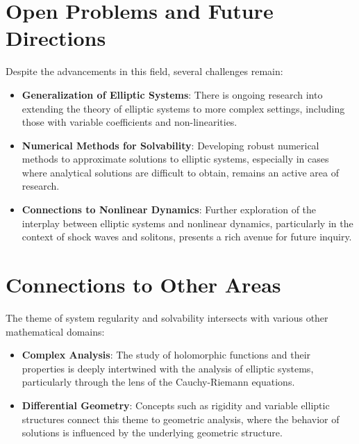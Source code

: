 \documentclass[11pt,a4paper]{article}
\begin{document}
\section{Open Problems and Future Directions}
Despite the advancements in this field, several challenges remain:

\begin{itemize}
\item \textbf{Generalization of Elliptic Systems}: There is ongoing research into extending the theory of elliptic systems to more complex settings, including those with variable coefficients and non-linearities.
\end{itemize}

\begin{itemize}
\item \textbf{Numerical Methods for Solvability}: Developing robust numerical methods to approximate solutions to elliptic systems, especially in cases where analytical solutions are difficult to obtain, remains an active area of research.
\end{itemize}

\begin{itemize}
\item \textbf{Connections to Nonlinear Dynamics}: Further exploration of the interplay between elliptic systems and nonlinear dynamics, particularly in the context of shock waves and solitons, presents a rich avenue for future inquiry.
\end{itemize}

\section{Connections to Other Areas}
The theme of system regularity and solvability intersects with various other mathematical domains:

\begin{itemize}
\item \textbf{Complex Analysis}: The study of holomorphic functions and their properties is deeply intertwined with the analysis of elliptic systems, particularly through the lens of the Cauchy-Riemann equations.
\end{itemize}

\begin{itemize}
\item \textbf{Differential Geometry}: Concepts such as rigidity and variable elliptic structures connect this theme to geometric analysis, where the behavior of solutions is influenced by the underlying geometric structure.
\end{itemize}
\end{document}
